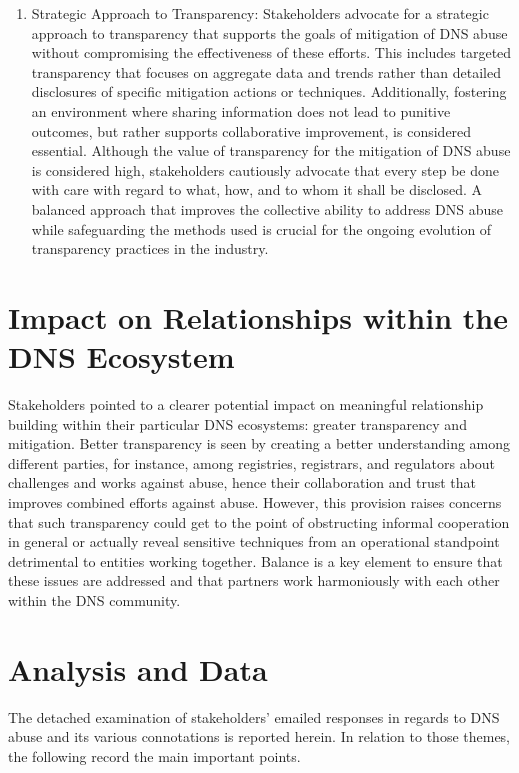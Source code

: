 \begin{enumerate}
    \item Strategic Approach to Transparency: Stakeholders advocate for a strategic approach to transparency that supports the goals of mitigation of DNS abuse without compromising the effectiveness of these efforts. This includes targeted transparency that focuses on aggregate data and trends rather than detailed disclosures of specific mitigation actions or techniques. Additionally, fostering an environment where sharing information does not lead to punitive outcomes, but rather supports collaborative improvement, is considered essential. Although the value of transparency for the mitigation of DNS abuse is considered high, stakeholders cautiously advocate that every step be done with care with regard to what, how, and to whom it shall be disclosed. A balanced approach that improves the collective ability to address DNS abuse while safeguarding the methods used is crucial for the ongoing evolution of transparency practices in the industry.

\end{enumerate}

\section{Impact on Relationships within the DNS Ecosystem} 

 Stakeholders pointed to a clearer potential impact on meaningful relationship building within their particular DNS ecosystems: greater transparency and mitigation. Better transparency is seen by creating a better understanding among different parties, for instance, among registries, registrars, and regulators about challenges and works against abuse, hence their collaboration and trust that improves combined efforts against abuse. However, this provision raises concerns that such transparency could get to the point of obstructing informal cooperation in general or actually reveal sensitive techniques from an operational standpoint detrimental to entities working together. Balance is a key element to ensure that these issues are addressed and that partners work harmoniously with each other within the DNS community.

\section{Analysis and Data } 

The detached examination of stakeholders' emailed responses in regards to DNS abuse and its various connotations is reported herein. In relation to those themes, the following record the main important points.


